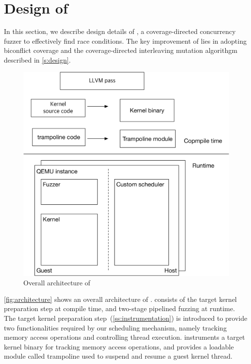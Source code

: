 \section{Design of \sys}
\label{s:impl}

In this section, we describe design details of \sys, a
coverage-directed concurrency fuzzer to effectively find race
conditions.
%
The key improvement of \sys lies in adopting biconflict coverage and
the coverage-directed interleaving mutation algorithgm described in
\autoref{s:design}.
%

\begin{figure}
  \includegraphics[width=0.9\linewidth]{fig/architecture.pdf}
  \caption{Overall architecture of \sys}
  \label{fig:architecture}
\end{figure}
%
\autoref{fig:architecture} shows an overall architecture of \sys.
%
\sys consists of the target kernel preparation step at compile time,
and two-stage pipelined fuzzing at runtime.
%
The target kernel preparation step~(\autoref{ss:instrumentation}) is
introduced to provide two functionalities required by our scheduling
mechanism, namely tracking memory access operations and controlling
thread execution.
%
\sys instruments a target kernel binary for tracking memory access
operations, and provides a loadable module called trampoline used to
suspend and resume a guest kernel thread.

